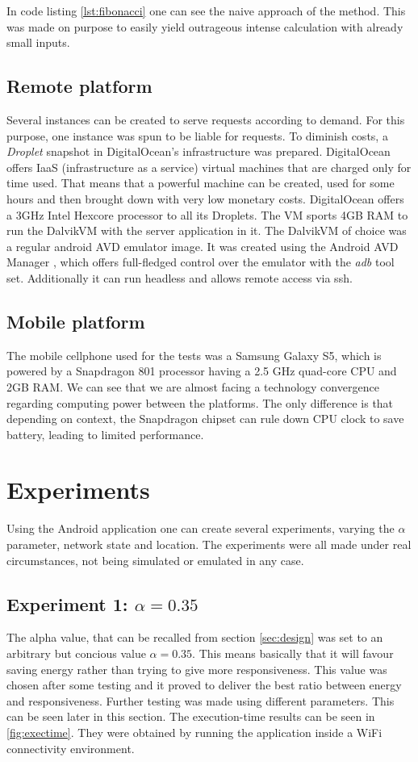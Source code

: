 \documentclass[10pt, conference, letterpaper]{IEEEtran}
\begin{document}
  In code listing \ref{lst:fibonacci} one can see the naive approach of the method. This was made on purpose to easily yield outrageous intense calculation with already small inputs.

  \subsection{Remote platform}
  Several instances can be created to serve requests according to demand. For this purpose, one instance was spun to be liable for requests. To diminish costs, a \textit{Droplet} snapshot in DigitalOcean's infrastructure \cite{digitalocean} was prepared. DigitalOcean offers IaaS (infrastructure as a service) virtual machines that are charged only for time used. That means that a powerful machine can be created, used for some hours and then brought down with very low monetary costs. DigitalOcean offers a 3GHz Intel Hexcore processor to all its Droplets. The VM sports 4GB RAM to run the DalvikVM with the server application in it. The DalvikVM of choice was a regular android AVD emulator image. It was created using the Android AVD Manager \cite{androidavd}, which offers full-fledged control over the emulator with the \textit{adb} tool set. Additionally it can run headless and allows remote access via ssh.

  \subsection{Mobile platform}
  The mobile cellphone used for the tests was a Samsung Galaxy S5, which is powered by a Snapdragon 801 processor having a 2.5 GHz quad-core CPU and 2GB RAM. We can see that we are almost facing a technology convergence regarding computing power between the platforms. The only difference is that depending on context, the Snapdragon chipset can rule down CPU clock to save battery, leading to limited performance.

  \section{Experiments}
  Using the Android application one can create several experiments, varying the $\alpha$ parameter, network state and location. The experiments were all made under real circumstances, not being simulated or emulated in any case.

  \subsection{Experiment 1: $\alpha = 0.35$}
  The alpha value, that can be recalled from section \ref{sec:design} was set to an arbitrary but concious value $\alpha = 0.35$. This means basically that it will favour saving energy rather than trying to give more responsiveness. This value was chosen after some testing and it proved to deliver the best ratio between energy and responsiveness. Further testing was made using different parameters. This can be seen later in this section. The execution-time results can be seen in \ref{fig:exectime}. They were obtained by running the application inside a WiFi connectivity environment.
\end{document}

